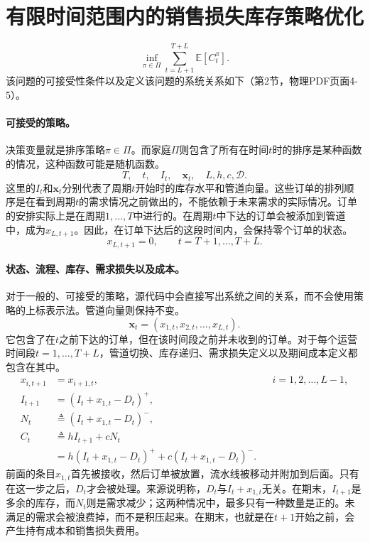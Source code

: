 \documentclass{article}
\begin{document}
\section*{有限时间范围内的销售损失库存策略优化}

\begin{equation}
\inf_{\pi\in\Pi}\sum_{t=L+1}^{T+L}\mathbb{E}[C_t^\pi].
\tag{1}
\end{equation}
该问题的可接受性条件以及定义该问题的系统关系如下（第2节，物理PDF页面4-5）。

\paragraph{可接受的策略。}
决策变量就是排序策略$\pi\in\Pi$。而家庭$\Pi$则包含了所有在时间$t$时的排序是某种函数的情况，这种函数可能是随机函数。
\[
T,\quad t,\quad I_t,\quad \mathbf{x}_t,\quad L,h,c,\mathcal{D}.
\]
这里的$I_t$和$\mathbf{x}_t$分别代表了周期$t$开始时的库存水平和管道向量。这些订单的排列顺序是在看到周期$t$的需求情况之前做出的，不能依赖于未来需求的实际情况。订单的安排实际上是在周期$1,\ldots,T$中进行的。在周期$t$中下达的订单会被添加到管道中，成为$x_{L,t+1}$。因此，在订单下达后的这段时间内，会保持零个订单的状态。
\[
x_{L,t+1}=0,\qquad t=T+1,\ldots,T+L.
\]

\paragraph{状态、流程、库存、需求损失以及成本。}
对于一般的、可接受的策略，源代码中会直接写出系统之间的关系，而不会使用策略的上标表示法。管道向量则保持不变。
\[
\mathbf{x}_t=(x_{1,t},x_{2,t},\ldots,x_{L,t}).
\]
它包含了在$t$之前下达的订单，但在该时间段之前并未收到的订单。对于每个运营时间段$t=1,\ldots,T+L$，管道切换、库存递归、需求损失定义以及期间成本定义都包含在其中。
\begin{align*}
x_{i,t+1}&=x_{i+1,t}, &&i=1,2,\ldots,L-1,\\
I_{t+1}&=(I_t+x_{1,t}-D_t)^+,\\
N_t&\triangleq (I_t+x_{1,t}-D_t)^-,\\
C_t&\triangleq hI_{t+1}+cN_t\\
   &=h(I_t+x_{1,t}-D_t)^+ + c(I_t+x_{1,t}-D_t)^-.
\end{align*}
前面的条目$x_{1,t}$首先被接收，然后订单被放置，流水线被移动并附加到后面。只有在这一步之后，$D_t$才会被处理。来源说明称，$D_t$与$I_t+x_{1,t}$无关。在期末，$I_{t+1}$是多余的库存，而$N_t$则是需求减少；这两种情况中，最多只有一种数量是正的。未满足的需求会被浪费掉，而不是积压起来。在期末，也就是在$t+1$开始之前，会产生持有成本和销售损失费用。
\end{document}
